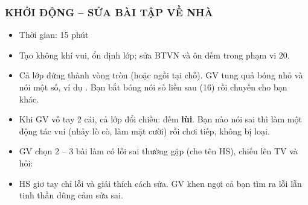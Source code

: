 \documentclass[../main.tex]{subfiles}
\begin{document}
\subsubsection{KHỞI ĐỘNG -- SỬA BÀI TẬP VỀ NHÀ}
\begin{hd}
    \begin{itemize}
        \item Thời gian: 15 phút
        \item Tạo không khí vui, ổn định lớp; sửa BTVN và ôn đếm trong phạm vi 20.
    \end{itemize}
\end{hd}
\begin{itemize}
    \item Cả lớp đứng thành vòng tròn (hoặc ngồi tại chỗ). GV tung quả bóng nhỏ và nói một số, ví dụ . Bạn bắt bóng nói số liền sau (16) rồi chuyền cho bạn khác.
    \item Khi GV vỗ tay 2 cái, cả lớp đổi chiều: đếm \textbf{lùi}. Bạn nào nói sai thì làm một động tác vui (nhảy lò cò, làm mặt cười) rồi chơi tiếp, không bị loại.
\end{itemize}
\begin{itemize}
    \item GV chọn 2 -- 3 bài làm có lỗi sai thường gặp (che tên HS), chiếu lên TV và hỏi: 
    \item HS giơ tay chỉ lỗi và giải thích cách sửa. GV khen ngợi cả bạn tìm ra lỗi lẫn tinh thần dũng cảm sửa sai.
\end{itemize}

\end{document}
